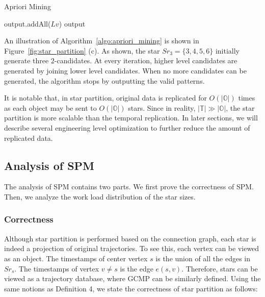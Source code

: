 \begin{algorithm}
\caption{Apriori Mining}
\label{algo:apriori_mining}
\begin{algorithmic}[1]
 
\EndFor
{}
			 
		\EndIf
\EndWhile
\State output.addAll($Lv$)
\State \Return output
\end{algorithmic}
\end{algorithm}
 
An illustration of Algorithm~\ref{algo:apriori_mining} is shown in Figure~\ref{fig:star_partition} (c).
As shown, the star $Sr_3=\{3,4,5,6\}$ initially generate three $2$-candidates. At every iteration, 
higher level candidates are generated by joining lower level candidates. When no more candidates 
can be generated, the algorithm stops by outputting the valid patterns.

It is notable that, in star partition, original data is 
replicated for $O(|\mathbb{O}|)$ times as each object may 
be sent to $O(|\mathbb{O}|)$ stars. Since in reality, $|\mathbb{T}| \gg |\mathbb{O}|$, 
the star partition is more scalable than the temporal replication.
In later sections, we will describe several engineering level optimization to further reduce the amount of replicated data.

\subsection{Analysis of SPM}
The analysis of SPM contains two parts. We first prove the correctness
of SPM. Then, we analyze the work load distribution of the star sizes.

\subsubsection{Correctness}
Although star partition is performed based on the connection graph, 
each star is indeed a projection of original trajectories.
To see this, each vertex can be viewed as an object. 
The timestamps of center vertex $s$ is the union of all the 
edges in $Sr_s$. The timestamps of vertex $v \neq s$ is the 
edge $e(s,v)$. Therefore, stars can be viewed as a trajectory
database, where GCMP can be similarly defined. Using the same 
notions as Definition 4, we state the correctness
of star partition as follows:

